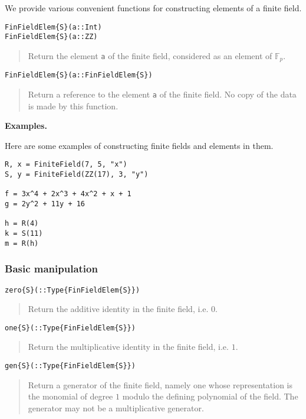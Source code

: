 \documentclass[a4paper,10pt]{article}
\newcommand{\F}{\mathbb{F}}
\newcommand{\code}{\lstinline}
\newcommand{\desc}[1]{\vspace{-3mm}\begin{quote}#1\end{quote}}
\begin{document}
{{{We provide various convenient functions for constructing elements of a finite
field.

\begin{lstlisting}
FinFieldElem{S}(a::Int)
FinFieldElem{S}(a::ZZ)
\end{lstlisting}

\desc{Return the element \code{a} of the finite field, considered as an element
of $\F_p$.}

\begin{lstlisting}
FinFieldElem{S}(a::FinFieldElem{S})
\end{lstlisting}

\desc{Return a reference to the element \code{a} of the finite field. No copy
of the data is made by this function.}

\textbf{Examples.}

Here are some examples of constructing finite fields and elements in them.

\begin{lstlisting}
R, x = FiniteField(7, 5, "x")
S, y = FiniteField(ZZ(17), 3, "y")

f = 3x^4 + 2x^3 + 4x^2 + x + 1
g = 2y^2 + 11y + 16

h = R(4)
k = S(11)
m = R(h)
\end{lstlisting}

\subsubsection{Basic manipulation}

\begin{lstlisting}
zero{S}(::Type{FinFieldElem{S}})
\end{lstlisting}

\desc{Return the additive identity in the finite field, i.e. $0$.}

\begin{lstlisting}
one{S}(::Type{FinFieldElem{S}})
\end{lstlisting}

\desc{Return the multiplicative identity in the finite field, i.e. $1$.}

\begin{lstlisting}
gen{S}(::Type{FinFieldElem{S}})
\end{lstlisting}

\desc{Return a generator of the finite field, namely one whose
representation is the monomial of degree $1$ modulo the defining
polynomial of the field. The generator may not be a multiplicative
generator.}

}}}
\end{document}
